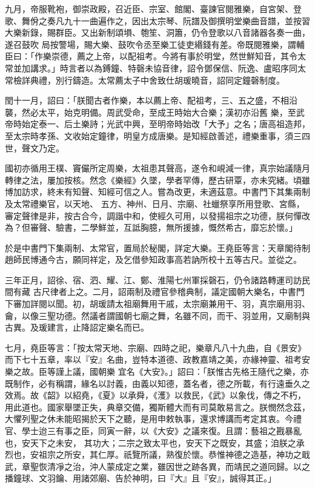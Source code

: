 \begin{pinyinscope}
 九月，帝服靴袍，御崇政殿，召近臣、宗室、館閣、臺諫官閱雅樂，自宮架、登歌、舞佾之奏凡九十一曲遍作之，因出太宗琴、阮譜及御撰明堂樂曲音譜，並按習大樂新錄，賜群臣。又出新制頌塤、匏笙、洞簫，仍令登歌以八音諸器各奏一曲，遂召鼓吹
 局按警場，賜大樂、鼓吹令丞至樂工徒吏緡錢有差。帝既閱雅樂，謂輔臣曰：「作樂崇德，薦之上帝，以配祖考。今將有事於明堂，然世鮮知音，其令太常並加講求。」時言者以為鎛鐘、特磬未協音律，詔令鄧保信、阮逸、盧昭序同太常檢詳典禮，別行鑄造。太常薦太子中舍致仕胡瑗曉音，詔同定鐘磬制度。



 閏十一月，詔曰：「朕聞古者作樂，本以薦上帝、配祖考，三、五之盛，不相沿襲，然必太平，始克明備。周武受命，至成王時始大合樂；漢初亦沿舊
 樂，至武帝時始定泰一、后土樂詩；光武中興，至明帝時始改「大予」之名；唐高祖造邦，至太宗時孝孫、文收始定鐘律，明皇方成唐樂。是知經啟善述，禮樂重事，須三四世，聲文乃定。



 國初亦循用王樸、竇儼所定周樂，太祖患其聲高，遂令和峴減一律，真宗始議隨月轉律之法，屢加按核。然念《樂經》久墜，學者罕傳，歷古研覃，亦未究緒。頃雖博加訪求，終未有知聲、知經可信之人。嘗為改更，未適茲意。中書門下其集兩制及太常禮樂官，以天地、
 五方、神州、日月、宗廟、社蠟祭享所用登歌、宮縣，審定聲律是非，按古合今，調諧中和，使經久可用，以發揚祖宗之功德，朕何憚改為？但審聲、驗書，二學鮮並，互詆胸臆，無所援據，慨然希古，靡忘於懷。」



 於是中書門下集兩制、太常官，置局於秘閣，詳定大樂。王堯臣等言：天章閣待制趙師民博通今古，願同祥定，及乞借參知政事高若訥所校十五等古尺。並從之。



 三年正月，詔徐、宿、泗、耀、江、鄭、淮陽七州軍採磬石，仍令諸路轉運司訪民間有藏
 古尺律者上之。二月，詔兩制及禮官參稽典制，議定國朝大樂名，中書門下審加詳閱以聞。初，胡瑗請太祖廟舞用干戚，太宗廟兼用干、羽，真宗廟用羽、龠，以像三聖功德。然議者謂國朝七廟之舞，名雖不同，而干、羽並用，又廟制與古異。及瑗建言，止降詔定樂名而已。



 七月，堯臣等言：「按太常天地、宗廟、四時之祀，樂章凡八十九曲，自《景安》而下七十五章，率以『安』名曲，豈特本道德、政教嘉靖之美，亦緣神靈、祖考安樂之故。臣等謹上議，國朝樂
 宜名《大安》。」詔曰：「朕惟古先格王隨代之樂，亦既制作，必有稱謂，緣名以討義，由義以知德，蓋名者，德之所載，有行遠垂久之效焉。故《韶》以紹堯，《夏》以承舜，《濩》以救民，《武》以象伐，傳之不朽，用此道也。國家舉墜正失，典章交備，獨斯體大而有司莫敢易言之。朕憫然念茲，大懼列聖之休未能昭揭於天下之聽，是用申敕執事，還求博講而考定其衷。今禮官、學士迨三有事之臣，同寅一辭，以《大安》之議來復。且謂：藝祖之戡暴亂也，安天下之未安，
 其功大；二宗之致太平也，安天下之既安，其盛；洎朕之承烈也，安祖宗之所安，其仁厚。祇覽所議，熟復於懷。恭惟神德之造基，神功之戢武，章聖恢清凈之治，沖人蒙成定之業，雖因世之跡各異，而靖民之道同歸。以之播鐘球、文羽鑰、用諸郊廟、告於神明，曰『大』且『安』，誠得其正。」




\end{pinyinscope}
